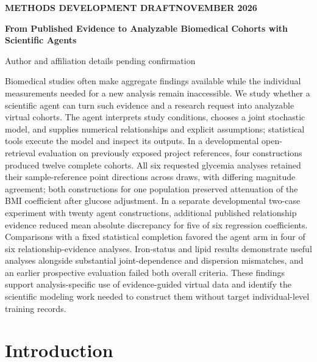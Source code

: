 \documentclass[11pt,letterpaper]{article}
\renewenvironment{abstract}{\small\par\noindent{\sffamily\bfseries\color{ink}Abstract}\quad\ignorespaces}{\par\medskip}
\begin{document}
\thispagestyle{plain}
{\sffamily\footnotesize\color{accent}\bfseries METHODS DEVELOPMENT DRAFT\quad\textbar\quad NOVEMBER 2026\par}
\vspace{.7em}
{\raggedright\sffamily\bfseries\fontsize{24}{29}\selectfont\color{ink}From Published Evidence to Analyzable Biomedical Cohorts with Scientific Agents\par}
\vspace{.5em}
{\small Author and affiliation details pending confirmation\par}
\vspace{.7em}
\begin{abstract}

Biomedical studies often make aggregate findings available while the individual measurements needed for a new analysis remain inaccessible. We study whether a scientific agent can turn such evidence and a research request into analyzable virtual cohorts. The agent interprets study conditions, chooses a joint stochastic model, and supplies numerical relationships and explicit assumptions; statistical tools execute the model and inspect its outputs. In a developmental open-retrieval evaluation on previously exposed project references, four constructions produced twelve complete cohorts. All six requested glycemia analyses retained their sample-reference point directions across draws, with differing magnitude agreement; both constructions for one population preserved attenuation of the BMI coefficient after glucose adjustment. In a separate developmental two-case experiment with twenty agent constructions, additional published relationship evidence reduced mean absolute discrepancy for five of six regression coefficients. Comparisons with a fixed statistical completion favored the agent arm in four of six relationship-evidence analyses. Iron-status and lipid results demonstrate useful analyses alongside substantial joint-dependence and dispersion mismatches, and an earlier prospective evaluation failed both overall criteria. These findings support analysis-specific use of evidence-guided virtual data and identify the scientific modeling work needed to construct them without target individual-level training records.

\end{abstract}

\section{Introduction}
\end{document}
